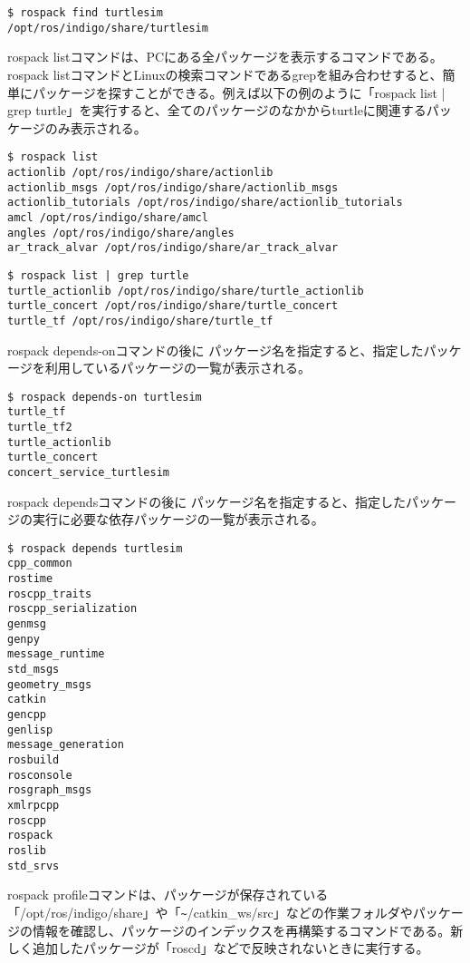 \begin{lstlisting}[language=ROS]
$ rospack find turtlesim
/opt/ros/indigo/share/turtlesim
\end{lstlisting}

rospack listコマンドは、PCにある全パッケージを表示するコマンドである。rospack listコマンドとLinuxの検索コマンドであるgrepを組み合わせすると、簡単にパッケージを探すことができる。例えば以下の例のように「rospack list | grep turtle」を実行すると、全てのパッケージのなかからturtleに関連するパッケージのみ表示される。

\begin{lstlisting}[language=ROS]
$ rospack list
actionlib /opt/ros/indigo/share/actionlib
actionlib_msgs /opt/ros/indigo/share/actionlib_msgs
actionlib_tutorials /opt/ros/indigo/share/actionlib_tutorials
amcl /opt/ros/indigo/share/amcl
angles /opt/ros/indigo/share/angles
ar_track_alvar /opt/ros/indigo/share/ar_track_alvar
\end{lstlisting}

\begin{lstlisting}[language=ROS]
$ rospack list | grep turtle
turtle_actionlib /opt/ros/indigo/share/turtle_actionlib
turtle_concert /opt/ros/indigo/share/turtle_concert
turtle_tf /opt/ros/indigo/share/turtle_tf
\end{lstlisting}

rospack depends-onコマンドの後に パッケージ名を指定すると、指定したパッケージを利用しているパッケージの一覧が表示される。

\begin{lstlisting}[language=ROS]
$ rospack depends-on turtlesim
turtle_tf
turtle_tf2
turtle_actionlib
turtle_concert
concert_service_turtlesim
\end{lstlisting}

rospack dependsコマンドの後に パッケージ名を指定すると、指定したパッケージの実行に必要な依存パッケージの一覧が表示される。

\begin{lstlisting}[language=ROS]
$ rospack depends turtlesim
cpp_common
rostime
roscpp_traits
roscpp_serialization
genmsg
genpy
message_runtime
std_msgs
geometry_msgs
catkin
gencpp
genlisp
message_generation
rosbuild
rosconsole
rosgraph_msgs
xmlrpcpp
roscpp
rospack
roslib
std_srvs
\end{lstlisting}

rospack profileコマンドは、パッケージが保存されている「/opt/ros/indigo/share」や「\verb|~|/catkin\_ws/src」などの作業フォルダやパッケージの情報を確認し、パッケージのインデックスを再構築するコマンドである。新しく追加したパッケージが「roscd」などで反映されないときに実行する。


